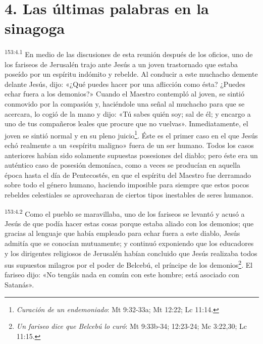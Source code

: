 \section*{4. Las últimas palabras en la sinagoga}
\par 
\textsuperscript{153:4.1} En medio de las discusiones de esta reunión después de los oficios, uno de los fariseos de Jerusalén trajo ante Jesús a un joven trastornado que estaba poseído por un espíritu indómito y rebelde. Al conducir a este muchacho demente delante Jesús, dijo: «¿Qué puedes hacer por una aflicción como ésta? ¿Puedes echar fuera a los demonios?» Cuando el Maestro contempló al joven, se sintió conmovido por la compasión y, haciéndole una señal al muchacho para que se acercara, lo cogió de la mano y dijo: «Tú sabes quién soy; sal de él; y encargo a uno de tus compañeros leales que procure que no vuelvas». Inmediatamente, el joven se sintió normal y en su pleno juicio\footnote{\textit{Curación de un endemoniado}: Mt 9:32-33a; Mt 12:22; Lc 11:14.}. Éste es el primer caso en el que Jesús echó realmente a un «espíritu maligno» fuera de un ser humano. Todos los casos anteriores habían sido solamente supuestas posesiones del diablo; pero éste era un auténtico caso de posesión demoníaca, como a veces se producían en aquella época hasta el día de Pentecostés, en que el espíritu del Maestro fue derramado sobre todo el género humano, haciendo imposible para siempre que estos pocos rebeldes celestiales se aprovecharan de ciertos tipos inestables de seres humanos.

\par 
\textsuperscript{153:4.2} Como el pueblo se maravillaba, uno de los fariseos se levantó y acusó a Jesús de que podía hacer estas cosas porque estaba aliado con los demonios; que gracias al lenguaje que había empleado para echar fuera a este diablo, Jesús admitía que se conocían mutuamente; y continuó exponiendo que los educadores y los dirigentes religiosos de Jerusalén habían concluido que Jesús realizaba todos sus supuestos milagros por el poder de Belcebú, el príncipe de los demonios\footnote{\textit{Un fariseo dice que Belcebú lo curó}: Mt 9:33b-34; 12:23-24; Mc 3:22,30; Lc 11:15.}. El fariseo dijo: «No tengáis nada en común con este hombre; está asociado con Satanás».


